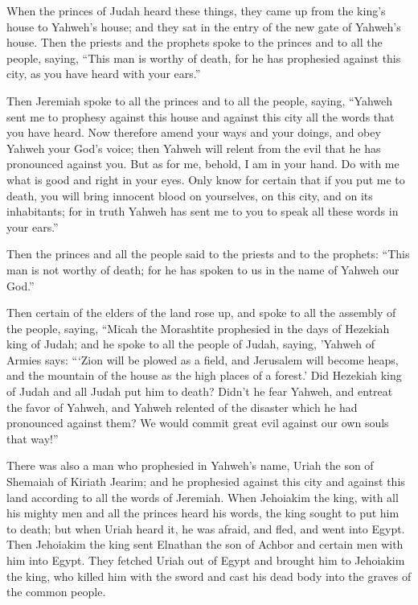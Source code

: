  When the princes of Judah heard these things, they came
up from the king's house to Yahweh's house; and they sat in the entry of
the new gate of Yahweh's house.  Then the priests and the
prophets spoke to the princes and to all the people, saying, ``This man
is worthy of death, for he has prophesied against this city, as you have
heard with your ears.''

 Then Jeremiah spoke to all the princes and to all the
people, saying, ``Yahweh sent me to prophesy against this house and
against this city all the words that you have heard.  Now
therefore amend your ways and your doings, and obey Yahweh your God's
voice; then Yahweh will relent from the evil that he has pronounced
against you.  But as for me, behold, I am in your hand.
Do with me what is good and right in your eyes.  Only
know for certain that if you put me to death, you will bring innocent
blood on yourselves, on this city, and on its inhabitants; for in truth
Yahweh has sent me to you to speak all these words in your ears.''

 Then the princes and all the people said to the priests
and to the prophets: ``This man is not worthy of death; for he has
spoken to us in the name of Yahweh our God.''

 Then certain of the elders of the land rose up, and
spoke to all the assembly of the people, saying,  ``Micah
the Morashtite prophesied in the days of Hezekiah king of Judah; and he
spoke to all the people of Judah, saying, 'Yahweh of Armies says:
```Zion will be plowed as a field, and Jerusalem will become heaps, and
the mountain of the house as the high places of a forest.'
 Did Hezekiah king of Judah and all Judah put him to
death? Didn't he fear Yahweh, and entreat the favor of Yahweh, and
Yahweh relented of the disaster which he had pronounced against them? We
would commit great evil against our own souls that way!''

 There was also a man who prophesied in Yahweh's name,
Uriah the son of Shemaiah of Kiriath Jearim; and he prophesied against
this city and against this land according to all the words of Jeremiah.
 When Jehoiakim the king, with all his mighty men and all
the princes heard his words, the king sought to put him to death; but
when Uriah heard it, he was afraid, and fled, and went into Egypt.
 Then Jehoiakim the king sent Elnathan the son of Achbor
and certain men with him into Egypt.  They fetched Uriah
out of Egypt and brought him to Jehoiakim the king, who killed him with
the sword and cast his dead body into the graves of the common people.

